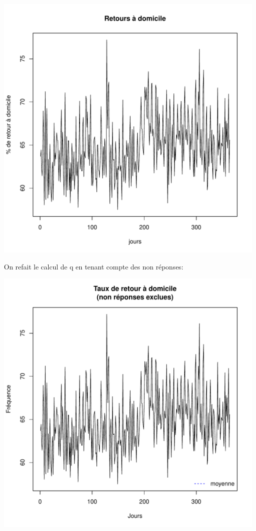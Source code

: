 \documentclass[12pt,english,french,twoside]{book}\usepackage[]{graphicx}\usepackage[]{color}
\makeatletter
\def\maxwidth{ %
  \ifdim\Gin@nat@width>\linewidth
    \linewidth
  \else
    \Gin@nat@width
  \fi
}
\makeatother
\begin{document}
\includegraphics[width=\maxwidth]{figure/retour_dom} 



On refait le calcul de q en tenant compte des non réponses:

\includegraphics[width=\maxwidth]{figure/retour_dom2} 
\end{document}
